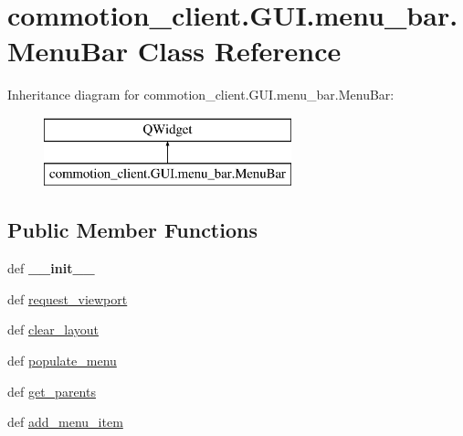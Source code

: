 \hypertarget{classcommotion__client_1_1GUI_1_1menu__bar_1_1MenuBar}{\section{commotion\-\_\-client.\-G\-U\-I.\-menu\-\_\-bar.\-Menu\-Bar Class Reference}
\label{classcommotion__client_1_1GUI_1_1menu__bar_1_1MenuBar}
}
Inheritance diagram for commotion\-\_\-client.\-G\-U\-I.\-menu\-\_\-bar.\-Menu\-Bar\-:\begin{figure}[H]
\begin{center}
\leavevmode
\includegraphics[height=2.000000cm]{classcommotion__client_1_1GUI_1_1menu__bar_1_1MenuBar}
\end{center}
\end{figure}
\subsection*{Public Member Functions}
\begin{DoxyCompactItemize}
\item 
\hypertarget{classcommotion__client_1_1GUI_1_1menu__bar_1_1MenuBar_a1f9817bd9c7f2dde1cc33aaec29151a9}{def {\bfseries \-\_\-\-\_\-init\-\_\-\-\_\-}}\label{classcommotion__client_1_1GUI_1_1menu__bar_1_1MenuBar_a1f9817bd9c7f2dde1cc33aaec29151a9}

\item 
def \hyperlink{classcommotion__client_1_1GUI_1_1menu__bar_1_1MenuBar_af0829b0f4a27a6246efbbe8c4412a283}{request\-\_\-viewport}
\item 
def \hyperlink{classcommotion__client_1_1GUI_1_1menu__bar_1_1MenuBar_aef9fda2956e1fffd9abbfbe420716519}{clear\-\_\-layout}
\item 
def \hyperlink{classcommotion__client_1_1GUI_1_1menu__bar_1_1MenuBar_a3ebeac5b69ad7004325183b547b3648a}{populate\-\_\-menu}
\item 
def \hyperlink{classcommotion__client_1_1GUI_1_1menu__bar_1_1MenuBar_a963ca3542a8f9ee6c8e8534fe530d443}{get\-\_\-parents}
\item 
def \hyperlink{classcommotion__client_1_1GUI_1_1menu__bar_1_1MenuBar_a7bbc3f3ab719dadb7943780dd17f1e82}{add\-\_\-menu\-\_\-item}
\end{DoxyCompactItemize}
